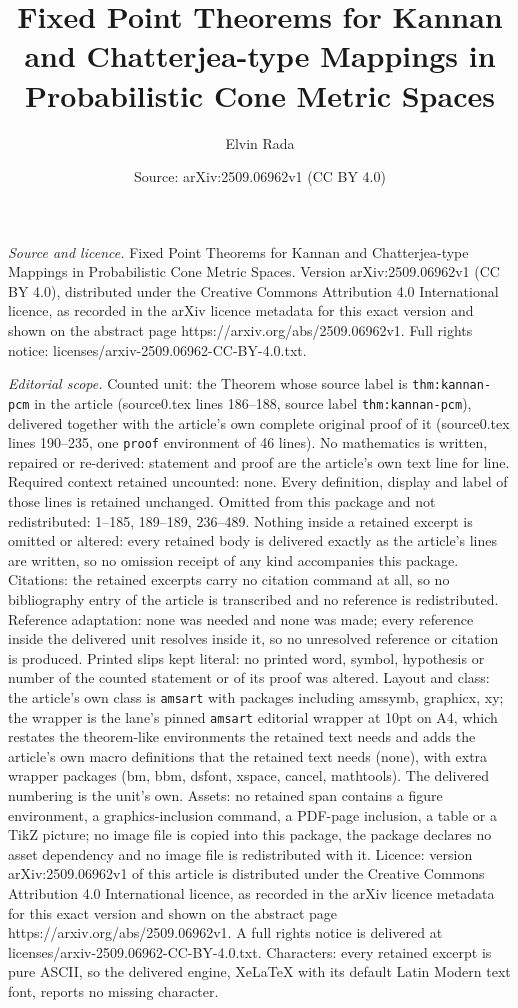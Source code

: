 \documentclass[10pt,a4paper]{amsart}
\title[Fixed Point Theorems for Kannan and Chatterjea-type Mappings]{Fixed Point Theorems for Kannan and Chatterjea-type Mappings in Probabilistic Cone Metric Spaces}
\author{Elvin Rada}
\date{Source: arXiv:2509.06962v1 (CC BY 4.0)}
\begin{document}
\maketitle

\noindent\emph{Source and licence.} Fixed Point Theorems for Kannan and Chatterjea-type Mappings in Probabilistic Cone Metric Spaces. Version arXiv:2509.06962v1 (CC BY 4.0), distributed under the Creative Commons Attribution 4.0 International licence, as recorded in the arXiv licence metadata for this exact version and shown on the abstract page https://arxiv.org/abs/2509.06962v1. Full rights notice: licenses/arxiv-2509.06962-CC-BY-4.0.txt.\par\smallskip

\noindent\textit{Editorial scope.} Counted unit: the Theorem whose source label is \texttt{thm:kannan-pcm} in the article (source0.tex lines 186--188, source label \texttt{thm:kannan-pcm}), delivered together with the article's own complete original proof of it (source0.tex lines 190--235, one \texttt{proof} environment of 46 lines). No mathematics is written, repaired or re-derived: statement and proof are the article's own text line for line. Required context retained uncounted: none. Every definition, display and label of those lines is retained unchanged. Omitted from this package and not redistributed: 1--185, 189--189, 236--489. Nothing inside a retained excerpt is omitted or altered: every retained body is delivered exactly as the article's lines are written, so no omission receipt of any kind accompanies this package. Citations: the retained excerpts carry no citation command at all, so no bibliography entry of the article is transcribed and no reference is redistributed. Reference adaptation: none was needed and none was made; every reference inside the delivered unit resolves inside it, so no unresolved reference or citation is produced. Printed slips kept literal: no printed word, symbol, hypothesis or number of the counted statement or of its proof was altered. Layout and class: the article's own class is \texttt{amsart} with packages including amssymb, graphicx, xy; the wrapper is the lane's pinned \texttt{amsart} editorial wrapper at 10pt on A4, which restates the theorem-like environments the retained text needs and adds the article's own macro definitions that the retained text needs (none), with extra wrapper packages (bm, bbm, dsfont, xspace, cancel, mathtools). The delivered numbering is the unit's own. Assets: no retained span contains a figure environment, a graphics-inclusion command, a PDF-page inclusion, a table or a TikZ picture; no image file is copied into this package, the package declares no asset dependency and no image file is redistributed with it. Licence: version arXiv:2509.06962v1 of this article is distributed under the Creative Commons Attribution 4.0 International licence, as recorded in the arXiv licence metadata for this exact version and shown on the abstract page https://arxiv.org/abs/2509.06962v1. A full rights notice is delivered at licenses/arxiv-2509.06962-CC-BY-4.0.txt. Characters: every retained excerpt is pure ASCII, so the delivered engine, XeLaTeX with its default Latin Modern text font, reports no missing character.
\end{document}
